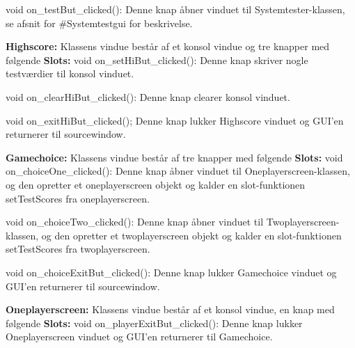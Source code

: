 \noindent void on\_testBut\_clicked():\newline
Denne knap åbner vinduet til Systemtester-klassen, se afsnit for \#Systemtestgui for beskrivelse.\newline

\noindent\textbf{Highscore:}\newline
Klassens vindue består af et konsol vindue og tre knapper med følgende\newline
\noindent \textbf{Slots:}\newline
\noindent void on\_setHiBut\_clicked():\newline
Denne knap skriver nogle testværdier til konsol vinduet.\newline

\noindent void on\_clearHiBut\_clicked():\newline
Denne knap clearer konsol vinduet. \newline

\noindent void on\_exitHiBut\_clicked();\newline
Denne knap lukker Highscore vinduet og GUI'en returnerer til sourcewindow.\newline

\noindent\textbf{Gamechoice:}\newline
\noindent Klassens vindue består af tre knapper med følgende \newline
\noindent \textbf{Slots:}\newline
\noindent void on\_choiceOne\_clicked():\newline
Denne knap åbner vinduet til Oneplayerscreen-klassen, og
den opretter et oneplayerscreen objekt og kalder en slot-funktionen setTestScores fra oneplayerscreen.\newline

\noindent void on\_choiceTwo\_clicked():\newline
Denne knap åbner vinduet til Twoplayerscreen-klassen, og
den opretter et twoplayerscreen objekt og kalder en slot-funktionen setTestScores fra twoplayerscreen.\newline

\noindent void on\_choiceExitBut\_clicked():\newline
Denne knap lukker Gamechoice vinduet og GUI'en returnerer til sourcewindow.\newline

\noindent\textbf{Oneplayerscreen:}\newline
Klassens vindue består af et konsol vindue, en knap med følgende\newline
\noindent \textbf{Slots:}\newline
void on\_playerExitBut\_clicked():\newline
Denne knap lukker Oneplayerscreen vinduet og GUI'en returnerer til Gamechoice.\newline


